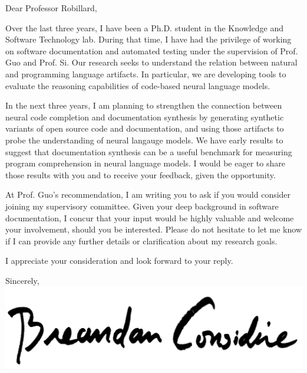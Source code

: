 \documentclass{letter}
\begin{document}
    \begin{letter}{}
        \opening{Dear Professor Robillard,\\}

        Over the last three years, I have been a Ph.D. student in the Knowledge and Software Technology lab. During that time, I have had the privilege of working on software documentation and automated testing under the supervision of Prof. Guo and Prof. Si. Our research seeks to understand the relation between natural and programming language artifacts. In particular, we are developing tools to evaluate the reasoning capabilities of code-based neural language models.

        In the next three years, I am planning to strengthen the connection between neural code completion and documentation synthesis by generating synthetic variants of open source code and documentation, and using those artifacts to probe the understanding of neural langauge models. We have early results to suggest that documentation synthesis can be a useful benchmark for measuring program comprehension in neural language models. I would be eager to share those results with you and to receive your feedback, given the opportunity.

        At Prof. Guo's recommendation, I am writing you to ask if you would consider joining my supervisory committee. Given your deep background in software documentation, I concur that your input would be highly valuable and welcome your involvement, should you be interested. Please do not hesitate to let me know if I can provide any further details or clarification about my research goals.

        I appreciate your consideration and look forward to your reply.\\

        \closing{Sincerely,\\
        \includegraphics[scale=0.06]{signature.png}\\
        }
    \end{letter}
\end{document}

